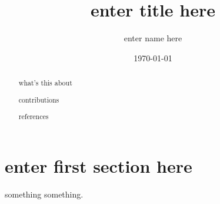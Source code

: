 \documentclass{article}
\begin{document}
\title{enter title here}
\author{enter name here}
\date{\today}
\maketitle

\begin{abstract}
    what's this about

    contributions

    references

\end{abstract}

\tableofcontents


% 

% 

\section{enter first section here}

something something.


% 
% 
% 
\end{document}
